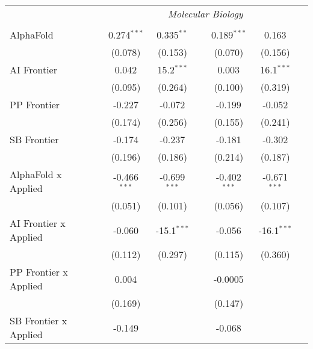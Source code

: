 \begin{tabular}{lcccccc}
 & \multicolumn{6}{c}{\textit{Molecular Biology}} \\ \\
   AlphaFold                      & 0.274$^{***}$  & 0.335$^{**}$   &                & 0.189$^{***}$  & 0.163          &   \\   
                                  & (0.078)        & (0.153)        &                & (0.070)        & (0.156)        &   \\   
   AI Frontier                    & 0.042          & 15.2$^{***}$   &                & 0.003          & 16.1$^{***}$   &   \\   
                                  & (0.095)        & (0.264)        &                & (0.100)        & (0.319)        &   \\   
   PP Frontier                    & -0.227         & -0.072         &                & -0.199         & -0.052         &   \\   
                                  & (0.174)        & (0.256)        &                & (0.155)        & (0.241)        &   \\   
   SB Frontier                    & -0.174         & -0.237         &                & -0.181         & -0.302         &   \\   
                                  & (0.196)        & (0.186)        &                & (0.214)        & (0.187)        &   \\   
   AlphaFold x Applied            & -0.466$^{***}$ & -0.699$^{***}$ &                & -0.402$^{***}$ & -0.671$^{***}$ &   \\   
                                  & (0.051)        & (0.101)        &                & (0.056)        & (0.107)        &   \\   
   AI Frontier x Applied          & -0.060         & -15.1$^{***}$  &                & -0.056         & -16.1$^{***}$  &   \\   
                                  & (0.112)        & (0.297)        &                & (0.115)        & (0.360)        &   \\   
   PP Frontier x Applied          & 0.004          &                &                & -0.0005        &                &   \\   
                                  & (0.169)        &                &                & (0.147)        &                &   \\   
   SB Frontier x Applied          & -0.149         &                &                & -0.068         &                &   \\   

\end{tabular}
